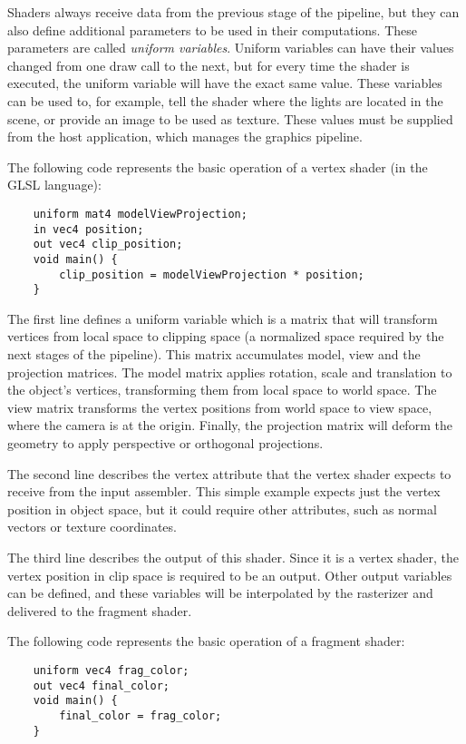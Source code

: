 Shaders always receive data from the previous stage of the pipeline, but they can also define additional parameters to be used in their computations. These parameters are called \textit{uniform variables}. Uniform variables can have their values changed from one draw call to the next, but for every time the shader is executed, the uniform variable will have the exact same value. These variables can be used to, for example, tell the shader where the lights are located in the scene, or provide an image to be used as texture. These values must be supplied from the host application, which manages the graphics pipeline.

The following code represents the basic operation of a vertex shader (in the GLSL language):

\begin{verbatim}
    uniform mat4 modelViewProjection;
    in vec4 position;
    out vec4 clip_position;
    void main() {
        clip_position = modelViewProjection * position;
    }
\end{verbatim}

The first line defines a uniform variable which is a matrix that will transform vertices from local space to clipping space (a normalized space required by the next stages of the pipeline). This matrix accumulates model, view and the projection matrices. The model matrix applies rotation, scale and translation to the object's vertices, transforming them from local space to world space. The view matrix transforms the vertex positions from world space to view space, where the camera is at the origin. Finally, the projection matrix will deform the geometry to apply perspective or orthogonal projections.

The second line describes the vertex attribute that the vertex shader expects to receive from the input assembler. This simple example expects just the vertex position in object space, but it could require other attributes, such as normal vectors or texture coordinates.

The third line describes the output of this shader. Since it is a vertex shader, the vertex position in clip space is required to be an output. Other output variables can be defined, and these variables will be interpolated by the rasterizer and delivered to the fragment shader.

The following code represents the basic operation of a fragment shader:

\begin{verbatim}
    uniform vec4 frag_color;
    out vec4 final_color;
    void main() {
        final_color = frag_color;
    }
\end{verbatim}

